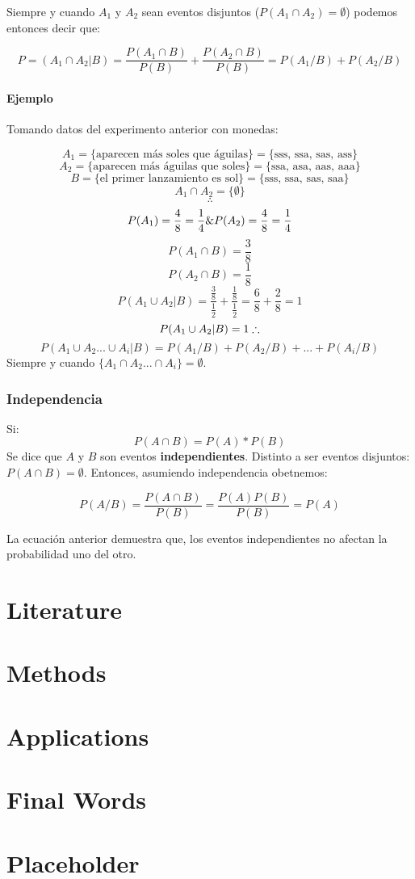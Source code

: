 \documentclass[]{book}
\begin{document}
Siempre y cuando \(A_1\) y \(A_2\) sean eventos disjuntos
(\(P(A_1\cap A_2) = \emptyset\)) podemos entonces decir que:

\[P = (A_1 \cap A_2 \vert B) = \frac {P(A_1 \cap B)}{P(B)}+ \frac {P(A_2 \cap B)}{P(B)} = P(A_1/B) + P(A_2/B)\]

\subsubsection{Ejemplo}\label{ejemplo-5}

Tomando datos del experimento anterior con monedas:

\[A_1 = \{\text{aparecen más soles que águilas}\} = \{\text{sss, ssa, sas, ass}\}\]
\[A_2 = \{\text{aparecen más águilas que soles}\} = \{\text{ssa, asa, aas, aaa}\}\]
\[B = \{\text{el primer lanzamiento es sol}\} = \{\text{sss, ssa, sas, saa}\}\]
\[A_1 \cap A_2 = \{\emptyset\}\] \[\therefore\]
\[P(A_1) = \frac {4}{8} = \frac {1}{4}\space \& \space P(A_2) = \frac {4}{8} = \frac {1}{4}\]
\[P(A_1\cap B) = \frac{3}{8}\] \[P(A_2\cap B) = \frac{1}{8}\]
\[P(A_1\cup A_2\vert B) = \frac {\frac{3}{8}}{\frac{1}{2}} + \frac{\frac{1}{8}}{\frac{1}{2}} = \frac{6}{8} + \frac{2}{8} = 1\]
\[P(A_1\cup A_2\vert B) = 1 \space \therefore\]
\[P(A_1\cup A_2...\cup A_i \vert B) = P(A_1/B) + P(A_2/B)+...+ P(A_i/B)\]
Siempre y cuando \(\{A_1\cap A_2...\cap A_i\}= \emptyset\).

\subsection{Independencia}\label{independencia-2}

Si: \[P(A\cap B) = P(A)*P(B)\] Se dice que \(A\) y \(B\) son eventos
\textbf{independientes}. Distinto a ser eventos disjuntos:
\(P(A\cap B) = \emptyset\). Entonces, asumiendo independencia obetnemos:

\[P(A/B) = \frac {P(A\cap B)}{P(B)} = \frac{P(A)P(B)}{P(B)} = P(A)\]

La ecuación anterior demuestra que, los eventos independientes no
afectan la probabilidad uno del otro.

\chapter{Literature}\label{literature}

\chapter{Methods}\label{methods}

\chapter{Applications}\label{applications}

\chapter{Final Words}\label{final-words}

\chapter{Placeholder}\label{placeholder}


\end{document}
